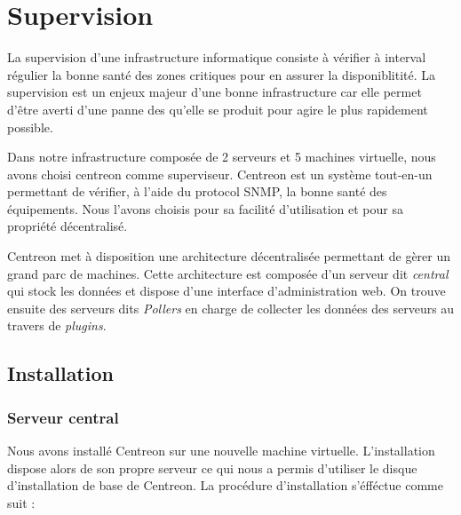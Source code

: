 \section{Supervision}

La supervision d'une infrastructure informatique consiste à vérifier à interval régulier la bonne santé des zones critiques pour en assurer la disponiblitité.
La supervision est un enjeux majeur d'une bonne infrastructure car elle permet d'être averti d'une panne des qu'elle se produit pour agire le plus rapidement possible.

Dans notre infrastructure composée de 2 serveurs et 5 machines virtuelle, nous avons choisi centreon comme superviseur.
Centreon est un système tout-en-un permettant de vérifier, à l'aide du protocol SNMP, la bonne santé des équipements.
Nous l'avons choisis pour sa facilité d'utilisation et pour sa propriété décentralisé.

Centreon met à disposition une architecture décentralisée permettant de gèrer un grand parc de machines.
Cette architecture est composée d'un serveur dit \emph{central} qui stock les données et dispose d'une interface d'administration web.
On trouve ensuite des serveurs dits \emph{Pollers} en charge de collecter les données des serveurs au travers de \emph{plugins}.

	\subsection{Installation}

	\subsubsection{Serveur central}

	Nous avons installé Centreon sur une nouvelle machine virtuelle.
	L'installation dispose alors de son propre serveur ce qui nous a permis d'utiliser le disque d'installation de base de Centreon.
	La procédure d'installation s'éfféctue comme suit :

